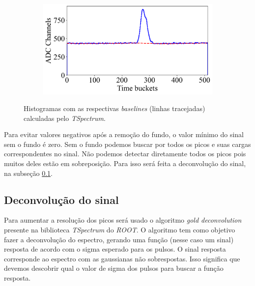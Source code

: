 \documentclass[a4paper,12pt,oneside]{book}
\begin{document}
\begin{figure}[H]
\begin{subfigure}[b]{0.48\textwidth}
        \caption{}
        \label{subfig:ex_sinal_bkg_3}
    \end{subfigure}%
    \hfill
    \begin{subfigure}[b]{0.48\textwidth}
        \centering
        \includegraphics[scale=0.395]{figs/ex_sinal_bkg_4.png}
        \caption{}
        \label{subfig:ex_sinal_bkg_4}
    \end{subfigure}
\caption{Histogramas com as respectivas \textit{baselines} (linhas tracejadas) calculadas pelo \textit{TSpectrum}.}
\label{fig:ex_sinal_bkg}
\end{figure}

\par Para evitar valores negativos após a remoção do fundo, o valor mínimo do sinal sem o fundo é zero. Sem o fundo podemos buscar por todos os picos e suas cargas correspondentes no sinal. Não podemos detectar diretamente todos os picos pois muitos deles estão em sobreposição. Para isso será feita a deconvolução do sinal, na subseção \ref{subsec:pulses_deconv}.



\subsection{Deconvolução do sinal}\label{subsec:pulses_deconv}

Para aumentar a resolução dos picos será usado o algoritmo \textit{gold deconvolution} presente na biblioteca \textit{TSpectrum} do \textit{ROOT}\cite{paper_gold_deconv}. O algoritmo tem como objetivo fazer a deconvolução do espectro, gerando uma função (nesse caso um sinal) resposta de acordo com o sigma esperado para os pulsos. O sinal resposta corresponde ao espectro com as gaussianas não sobrespostas. Isso significa que devemos descobrir qual o valor de sigma dos pulsos para buscar a função resposta.
\end{document}
